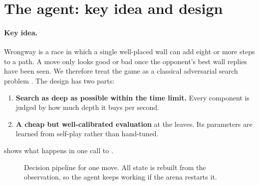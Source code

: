 \section{The agent: key idea and design}
\label{sec:agent}

\paragraph{Key idea.}
Wrongway is a race in which a single well-placed wall can add eight or more steps to a path.
A move only looks good or bad once the opponent's best wall replies have been seen.
We therefore treat the game as a classical adversarial search problem
\citep{knuth1975alphabeta}. The design has two parts:
\begin{enumerate}
  \item \textbf{Search as deep as possible within the time limit.} Every component is judged
        by how much depth it buys per second.
  \item \textbf{A cheap but well-calibrated evaluation} at the leaves. Its parameters are
        learned from self-play rather than hand-tuned.
\end{enumerate}
 shows what happens in one call to .

\begin{figure}[!htbp]
\centering
{}
\caption{Decision pipeline for one move. All state is rebuilt from the observation, so the agent
keeps working if the arena restarts it.}
\label{fig:pipeline}
\end{figure}

